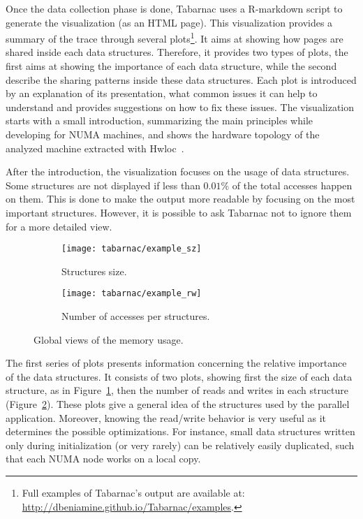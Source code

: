 Once the data collection phase is done, \gls{Tabarnac} uses a \gls{R-markdown} script to generate the visualization (as an HTML page).
This visualization provides a summary of the trace through several plots\footnote{
    Full examples of \gls{Tabarnac}'s output are available at:\\ \url{http://dbeniamine.github.io/Tabarnac/examples}.}.
It aims at showing how pages are shared inside each data structures.
Therefore, it provides two types of plots, the first aims at showing the importance of each data structure, while the second describe the sharing patterns inside these data structures.
Each plot is introduced by an explanation of its presentation, what common issues it can help to understand and provides suggestions on how to fix these issues.
The visualization starts with a small introduction, summarizing the main principles while developing for \gls{NUMA} machines, and shows the hardware topology of the analyzed machine extracted
with Hwloc~\cite{Broquedis10hwloc}.

After the introduction, the visualization focuses on the usage of data structures.
Some structures are not displayed if less than $0.01\%$ of the total accesses happen on them.
This is done to make the output more readable by focusing on the most important structures.
However, it is possible to ask \gls{Tabarnac} not to ignore them for a more detailed view.

\begin{figure}[htb]
    \centering
    \begin{subfigure}{.49\linewidth}
        \texttt{[image: tabarnac/example\_sz]}
        \caption{Structures size.}
        \label{fig:example_sz}
    \end{subfigure}
    \begin{subfigure}{.49\linewidth}
        \texttt{[image: tabarnac/example\_rw]}
        \caption{Number of accesses per structures.}
        \label{fig:example_rw}
    \end{subfigure}
    \caption{Global views of the memory usage.}
    \label{fig:example_plot1}
\end{figure}

The first series of plots presents information concerning the relative importance of the data structures.
It consists of two plots, showing first the size of each data structure, as in Figure~\ref{fig:example_sz}, then the number of reads and writes in each structure (Figure~\ref{fig:example_rw}).
These plots give a general idea of the structures used by the parallel application.
Moreover, knowing the read/write behavior is very useful as it determines the possible optimizations.
For instance, small data structures written only during initialization (or very rarely) can be relatively easily
duplicated, such that each \gls{NUMA} node works on a local copy.

